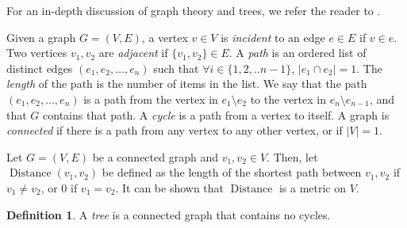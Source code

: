 \documentclass{article}
\theoremstyle{definition}
\newtheorem{defin}[thm]{Definition}
\DeclareMathOperator{\dist}{Distance}
\begin{document}
For an in-depth discussion of graph theory and trees, we refer the reader to \cite{mgt}.

Given a graph $G = (V, E)$, a vertex $v \in V$ is \emph{incident} to an edge $e \in E$ if $v \in e$. Two vertices $v_1, v_2$ are \emph{adjacent} if $\{v_1, v_2\} \in E$. A \emph{path} is an ordered list of distinct edges $(e_1, e_2, \ldots, e_n)$ such that $\forall i \in \{1, 2, .. n-1\}$, $|e_1 \cap e_2| = 1$. The \emph{length} of the path is the number of items in the list. We say that the path $(e_1, e_2, \ldots, e_n)$ is a path from the vertex in $e_1 \setminus e_2$ to the vertex in $e_{n} \setminus e_{n-1}$, and that $G$ contains that path. A \emph{cycle} is a path from a vertex to itself. A graph is \emph{connected} if there is a path from any vertex to any other vertex, or if $|V| = 1$.


Let $G = (V, E)$ be a connected graph and $v_1, v_2 \in V$. Then, let $\dist(v_1,v_2)$ be defined as the length of the shortest path between $v_1, v_2$ if $v_1 \neq v_2$, or $0$ if $v_1 = v_2$. It can be shown that $\dist$ is a metric on $V$.

    

\begin{defin}
    A \emph{tree} is a connected graph that contains no cycles.
\end{defin}
\end{document}
